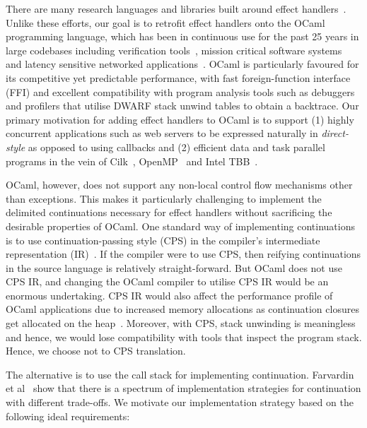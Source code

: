 \documentclass[sigplan,10pt,review,anonymous]{acmart}\settopmatter{printfolios=true,printccs=false,printacmref=false}
\begin{document}
There are many research languages and libraries built around effect
handlers~\cite{Koka,Links,Pyro,Frank,Eff}. Unlike these efforts, our goal is to
retrofit effect handlers onto the OCaml programming language, which has been in
continuous use for the past 25 years in large codebases including verification
tools~\cite{FStar,Coq}, mission critical software systems~\cite{astree} and
latency sensitive networked applications~\cite{JS,Docker,MirageOS}. OCaml is
particularly favoured for its competitive yet predictable performance, with
fast foreign-function interface (FFI) and excellent compatibility with program
analysis tools such as debuggers and profilers that utilise DWARF stack unwind
tables to obtain a backtrace. Our primary motivation for adding effect handlers
to OCaml is to support (1) highly concurrent applications such as web servers
to be expressed naturally in \emph{direct-style} as opposed to using callbacks
and (2) efficient data and task parallel programs in the vein of Cilk~\cite{},
OpenMP~\cite{} and Intel TBB~\cite{}.

OCaml, however, does not support any non-local control flow mechanisms other
than exceptions. This makes it particularly challenging to implement the
delimited continuations necessary for effect handlers without sacrificing the
desirable properties of OCaml. One standard way of implementing continuations is
to use continuation-passing style (CPS) in the compiler's intermediate
representation (IR)~\cite{Koka}. If the compiler were to use CPS, then reifying
continuations in the source language is relatively straight-forward. But OCaml
does not use CPS IR, and changing the OCaml compiler to utilise CPS IR would be
an enormous undertaking. CPS IR would also affect the performance profile of
OCaml applications due to increased memory allocations as continuation closures
get allocated on the heap~\cite{Folklore}. Moreover, with CPS, stack unwinding
is meaningless and hence, we would lose compatibility with tools that inspect
the program stack. Hence, we choose not to CPS translation.

The alternative is to use the call stack for implementing continuation.
Farvardin et al~\cite{Folklore} show that there is a spectrum of implementation
strategies for continuation with different trade-offs. We motivate our
implementation strategy based on the following ideal requirements:
\end{document}
